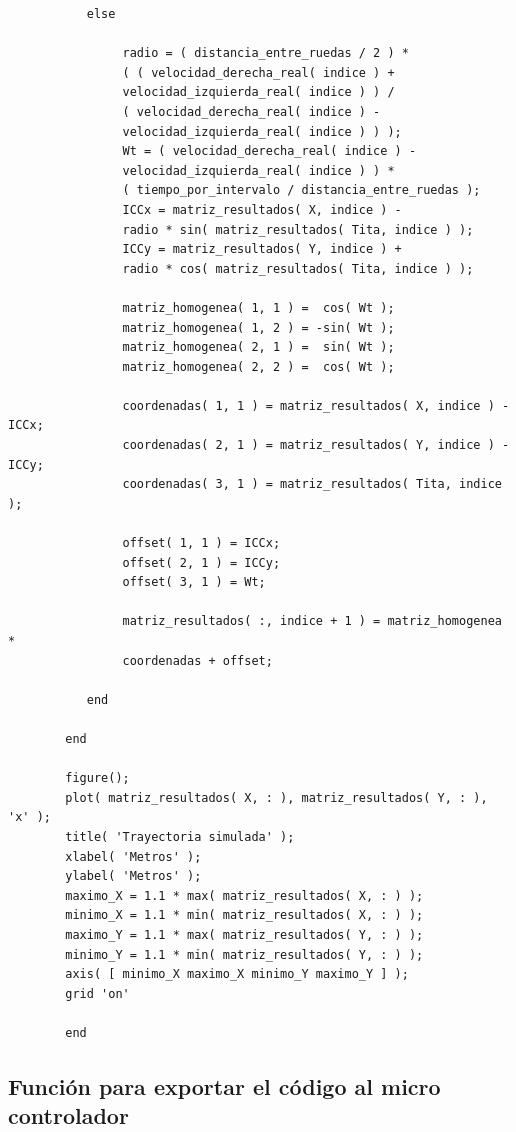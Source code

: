 \documentclass[12pt,a4paper]{article}
\begin{document}
\begin{verbatim}
           else

                radio = ( distancia_entre_ruedas / 2 ) *
                ( ( velocidad_derecha_real( indice ) +
                velocidad_izquierda_real( indice ) ) /
                ( velocidad_derecha_real( indice ) -
                velocidad_izquierda_real( indice ) ) );
                Wt = ( velocidad_derecha_real( indice ) -
                velocidad_izquierda_real( indice ) ) *
                ( tiempo_por_intervalo / distancia_entre_ruedas );
                ICCx = matriz_resultados( X, indice ) -
                radio * sin( matriz_resultados( Tita, indice ) );
                ICCy = matriz_resultados( Y, indice ) +
                radio * cos( matriz_resultados( Tita, indice ) );

                matriz_homogenea( 1, 1 ) =  cos( Wt );
                matriz_homogenea( 1, 2 ) = -sin( Wt );
                matriz_homogenea( 2, 1 ) =  sin( Wt );
                matriz_homogenea( 2, 2 ) =  cos( Wt );

                coordenadas( 1, 1 ) = matriz_resultados( X, indice ) - ICCx;
                coordenadas( 2, 1 ) = matriz_resultados( Y, indice ) - ICCy;
                coordenadas( 3, 1 ) = matriz_resultados( Tita, indice );

                offset( 1, 1 ) = ICCx;
                offset( 2, 1 ) = ICCy;
                offset( 3, 1 ) = Wt;

                matriz_resultados( :, indice + 1 ) = matriz_homogenea *
                coordenadas + offset;

           end

        end
    
        figure();
        plot( matriz_resultados( X, : ), matriz_resultados( Y, : ), 'x' );
        title( 'Trayectoria simulada' );
        xlabel( 'Metros' );
        ylabel( 'Metros' );
        maximo_X = 1.1 * max( matriz_resultados( X, : ) );
        minimo_X = 1.1 * min( matriz_resultados( X, : ) );
        maximo_Y = 1.1 * max( matriz_resultados( Y, : ) );
        minimo_Y = 1.1 * min( matriz_resultados( Y, : ) );
        axis( [ minimo_X maximo_X minimo_Y maximo_Y ] );
        grid 'on'
        
        end
		\end{verbatim}
        
        
        \subsection{Función para exportar el código al micro controlador}
        
\end{document}
